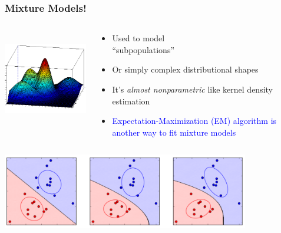 \documentclass[xcolor={dvipsnames}]{beamer}
\begin{document}
\frame
{
 \frametitle{Mixture Models!}

\begin{columns}
\begin{column}{.5\textwidth}
$\quad$\includegraphics[width=2in]{stuffs/mixture.png}

\end{column}
\begin{column}{.5\textwidth}

\vspace{-2em}
\begin{itemize}
\item<1-> Used to model \\``subpopulations''
\item<2-> Or simply complex distributional shapes
\item<3-> It's \emph{almost nonparametric} like kernel density estimation
\item<4-> \textcolor{blue}{Expectation-Maximization (EM) algorithm is another way to fit mixture models}
\end{itemize}

\end{column}
\end{columns}

 \includegraphics[width=4.25in]{stuffs/linear_discriminants.png}


}
\end{document}
